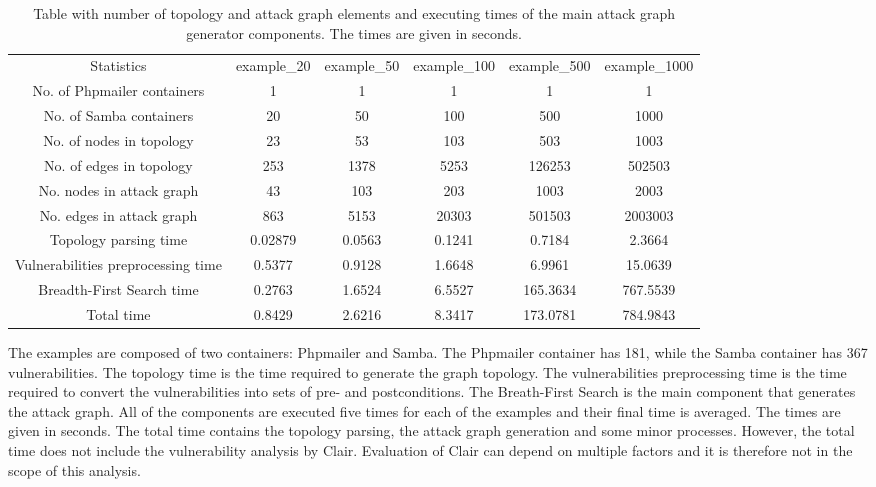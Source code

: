 \begin{table*}
	\begin{center}
		\begin{tabular}{ |c|c|c|c|c|c| } 
			\hline
			Statistics & example\_20 & example\_50 & example\_100 & example\_500 & example\_1000 \\ 
			
			No. of Phpmailer containers & 1 & 1 & 1 & 1 & 1 \\ 
			
			No. of Samba containers & 20 & 50 & 100 & 500 & 1000 \\ 
			
			No. of nodes in topology & 23 & 53 & 103 & 503 & 1003\\ 
			
			No. of edges in topology & 253 & 1378 & 5253 & 126253 & 502503 \\ 
			
			No. nodes in attack graph & 43 & 103 & 203 & 1003 & 2003 \\ 
			
			No. edges in attack graph & 863 & 5153 & 20303 & 501503 & 2003003 \\ 
			
			Topology parsing time & 0.02879 & 0.0563 & 0.1241 & 0.7184 & 2.3664 \\ 
			
			Vulnerabilities preprocessing time & 0.5377 & 0.9128 & 1.6648 & 6.9961 & 15.0639 \\ 
			
			Breadth-First Search time & 0.2763 & 1.6524 & 6.5527 & 165.3634 & 767.5539 \\ 
			
			Total time & 0.8429 & 2.6216 & 8.3417 & 173.0781 & 784.9843 \\ 
			\hline
		\end{tabular}
	\end{center}
	
	\caption{Table with number of topology and attack graph elements and executing times of the main attack graph generator components. The times are given in seconds.}
	
	\label{table_scalability}
\end{table*}
The examples are composed of two containers: Phpmailer and Samba. The Phpmailer container has 181, while the Samba container has 367 vulnerabilities. The topology time is the time required to generate the graph topology. The vulnerabilities preprocessing time is the time required to convert the vulnerabilities into sets of pre- and postconditions. The Breath-First Search is the main component that generates the attack graph. All of the components are executed five times for each of the examples and their final time is averaged. The times are given in seconds. The total time contains the topology parsing, the attack graph generation and some minor processes. However, the total time does not include the vulnerability analysis by Clair. Evaluation of Clair can depend on multiple factors and it is therefore not in the scope of this analysis.

